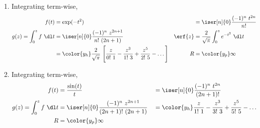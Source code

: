 \begin{enumerate}
    \item Integrating term-wise,
          \begin{align}
              f(t)                     & = \exp(-t^2)                               &
                                       & = \iser[n]{0} \frac{(-1)^n\ t^{2n}}
              {n!}                                                                    \\
              g(z) = \int_0^z f\ \dl t & = \iser[n]{0} \frac{(-1)^n\ z^{2n+1}}
              {n!\ (2n+1)}             &
              \erf{z}                  & = \frac{2}{\sqrt{\pi}} \int_{0}^{z}
              e^{-t^2}\ \dl t                                                         \\
                                       & = \color{y_h} \frac{2}{\sqrt{\pi}}\ \Bigg[
                  \frac{z}{0!\ 1} - \frac{z^3}{1!\ 3} + \frac{z^5}{2!\ 5} - \dots
              \Bigg]                   &
              R                        & = \color{y_p} \infty
          \end{align}

    \item Integrating term-wise,
          \begin{align}
              f(t)                     & = \frac{\sin(t)}{t}                   &
                                       & = \iser[n]{0} \frac{(-1)^n\ t^{2n}}
              {(2n+1)!}                                                          \\
              g(z) = \int_0^z f\ \dl t & = \iser[n]{0} \frac{(-1)^n\ z^{2n+1}}
              {(2n+1)!\ (2n+1)}        &
                                       & = \color{y_h} \frac{z}{1!\ 1}
              - \frac{z^3}{3!\ 3} + \frac{z^5}{5!\ 5} - \dots                    \\
              R                        & = \color{y_p} \infty
          \end{align}


\end{enumerate}
